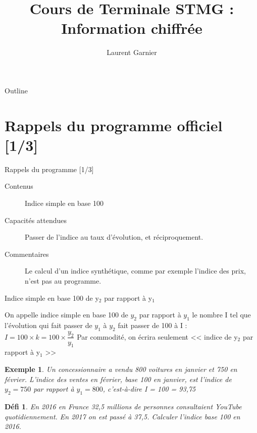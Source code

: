 \documentclass[presentation]{beamer}
\author{Laurent Garnier}
\date{}
\title{Cours de Terminale STMG : Information chiffrée}
\newtheorem{defi}{Défi}[section]
\newtheorem{exe}{Exemple}[section]
\begin{document}
\maketitle
\begin{frame}{Outline}
\tableofcontents
\end{frame}



\section{Rappels du programme officiel [1/3]}
\label{sec:orge7de06d}
\begin{frame}[label={sec:org2bc31e7}]{Rappels du programme [1/3]}
\begin{description}
\item[{Contenus}] Indice simple en base 100
\item[{Capacités attendues}] Passer de l'indice au taux d'évolution,
et réciproquement.
\item[{Commentaires}] Le calcul d'un indice synthétique, comme par
exemple l'indice des prix, n'est pas au programme.
\end{description}
\end{frame}

\begin{frame}[label={sec:org5f4f347}]{Indice simple en base 100 de y\(_{\text{2}}\) par rapport à y\(_{\text{1}}\)}
\begin{definition}
On appelle \alert{indice simple en base 100} de \(y_2\) par rapport à \(y_1\)
le nombre I tel que l'évolution qui fait passer de \(y_1\) à \(y_2\)
fait passer de 100 à I : \(I = 100\times k = 100\times \dfrac{y_2}{y_1}\)
Par commodité, on écrira seulement << indice de y\(_{\text{2}}\) par rapport à
y\(_{\text{1}}\) >>
\end{definition}

\begin{exe}
Un concessionnaire a vendu 800 voitures en janvier et 750 en
février. L'indice des ventes en février, base 100 en janvier, est
l'indice de \(y_2 = 750\) par rapport à \(y_1 = 800\), c'est-à-dire I =
100\texttimes{}  = 93,75
\end{exe}

\begin{defi}
En 2016 en France 32,5 millions de personnes consultaient YouTube
quotidiennement. En 2017 on est passé à 37,5. Calculer l'indice
base 100 en 2016.
\end{defi}
\end{frame}
\end{document}
